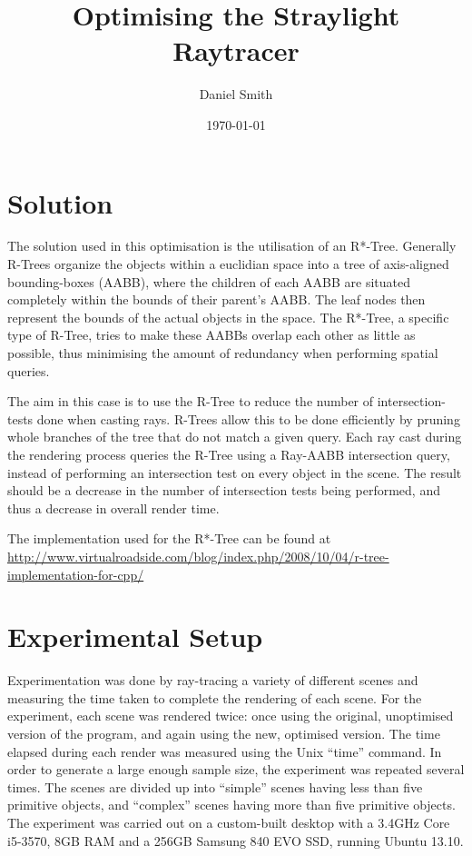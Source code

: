 \documentclass[a4paper]{article}
\title{Optimising the Straylight Raytracer}
\author{Daniel Smith}
\date{\today}
\begin{document}
\maketitle

\section{Solution}
The solution used in this optimisation is the utilisation of an R*-Tree. Generally R-Trees organize the objects within a euclidian space into a tree of axis-aligned bounding-boxes (AABB), where the children of each AABB are situated completely within the bounds of their parent's AABB. The leaf nodes then represent the bounds of the actual objects in the space. The R*-Tree, a specific type of R-Tree, tries to make these AABBs overlap each other as little as possible, thus minimising the amount of redundancy when performing spatial queries.

The aim in this case is to use the R-Tree to reduce the number of intersection-tests done when casting rays. R-Trees allow this to be done efficiently by pruning whole branches of the tree that do not match a given query. Each ray cast during the rendering process queries the R-Tree using a Ray-AABB intersection query, instead of performing an intersection test on every object in the scene. The result should be a decrease in the number of intersection tests being performed, and thus a decrease in overall render time.

\vspace{5 mm}

{\footnotesize
  The implementation used for the R*-Tree can be found at \url{http://www.virtualroadside.com/blog/index.php/2008/10/04/r-tree-implementation-for-cpp/}
}

\section{Experimental Setup}
Experimentation was done by ray-tracing a variety of different scenes and measuring the time taken to complete the rendering of each scene. For the experiment, each scene was rendered twice: once using the original, unoptimised version of the program, and again using the new, optimised version. The time elapsed during each render was measured using the Unix ``time'' command. In order to generate a large enough sample size, the experiment was repeated several times. The scenes are divided up into ``simple'' scenes having less than five primitive objects, and ``complex'' scenes having more than five primitive objects. The experiment was carried out on a custom-built desktop with a 3.4GHz Core i5-3570, 8GB RAM and a 256GB Samsung 840 EVO SSD, running Ubuntu 13.10.
\end{document}

